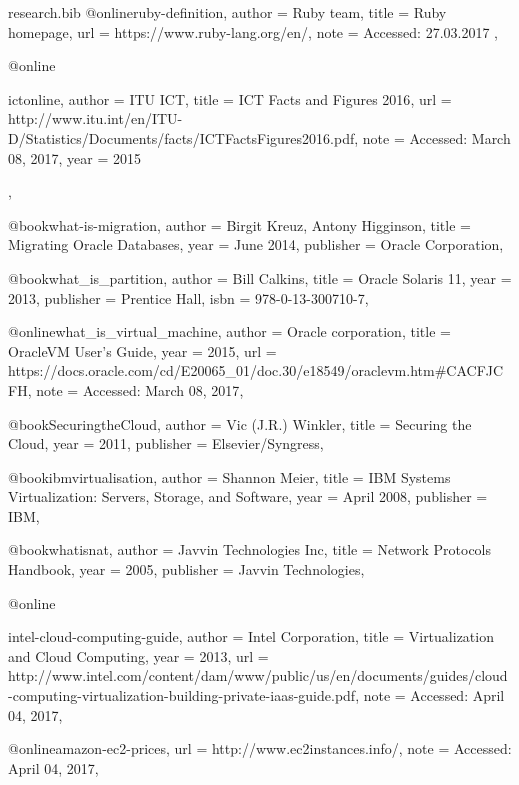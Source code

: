 \documentclass{article}
\begin{document}
\begin{filecontents*}{research.bib}
    @online{ruby-definition,
        author = {Ruby team},
        title = {Ruby homepage},
        url = {https://www.ruby-lang.org/en/},
    note = {Accessed: 27.03.2017}
    },


    @online{ictonline,
        author = {ITU ICT},
        title = {ICT Facts and Figures 2016},
        url = {http://www.itu.int/en/ITU-D/Statistics/Documents/facts/ICTFactsFigures2016.pdf},
        note = {Accessed: March 08, 2017},
        year = {2015}

    },

    @book{what-is-migration,
        author    = {Birgit Kreuz, Antony Higginson},
        title     = {Migrating Oracle Databases},
        year      = {June 2014},
        publisher = {Oracle Corporation},
    }


    @book{what_is_partition,
        author    = {Bill Calkins},
        title     = {Oracle Solaris 11},
        year      = {2013},
        publisher = {Prentice Hall},
        isbn      =  {978-0-13-300710-7},
    }

    @online{what_is_virtual_machine,
        author    = {Oracle corporation},
        title     = {Oracle\texttrademark VM User's Guide},
        year      = {2015},
        url = {https://docs.oracle.com/cd/E20065_01/doc.30/e18549/oraclevm.htm#CACFJCFH},
        note = {Accessed: March 08, 2017},
    }

    @book{SecuringtheCloud,
        author    = {Vic (J.R.) Winkler},
        title     = {Securing the Cloud},
        year      = {2011},
        publisher = {Elsevier/Syngress},
    }

    @book{ibmvirtualisation,
        author    = {Shannon Meier},
        title     = {IBM Systems Virtualization: Servers, Storage, and Software},
        year      = {April 2008},
        publisher = {IBM},
    }

    @book{whatisnat,
        author    = {Javvin Technologies Inc},
        title     = {Network Protocols Handbook},
        year      = {2005},
        publisher = {Javvin Technologies},
    }

    @online{intel-cloud-computing-guide,
        author = {Intel Corporation},
        title = {Virtualization and Cloud Computing},
        year = {2013},
        url = {http://www.intel.com/content/dam/www/public/us/en/documents/guides/cloud-computing-virtualization-building-private-iaas-guide.pdf},
        note = {Accessed: April 04, 2017},
        
    }

    @online{amazon-ec2-prices,
        url = {http://www.ec2instances.info/},
        note = {Accessed: April 04, 2017},
    }


\end{filecontents*}
\end{document}
